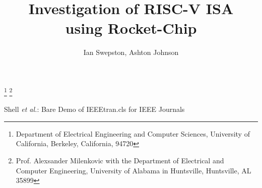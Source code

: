 \documentclass[journal]{IEEEtran}
\begin{document}
%
\title{Investigation of RISC-V ISA\\using Rocket-Chip}
%
%
%

\author{Ian Swepston, Ashton Johnson}%
\thanks{Department of Electrical Engineering and Computer Sciences, University of California, Berkeley, California, 94720}%
\thanks{Prof. Alexsander Milenkovic with the Department of Electrical and \\Computer Engineering, University of Alabama in Huntsville, Huntsville, AL 35899}%

% 
%



%
{Shell \MakeLowercase{\textit{et al.}}: Bare Demo of IEEEtran.cls for IEEE Journals}
% 
\end{document}
